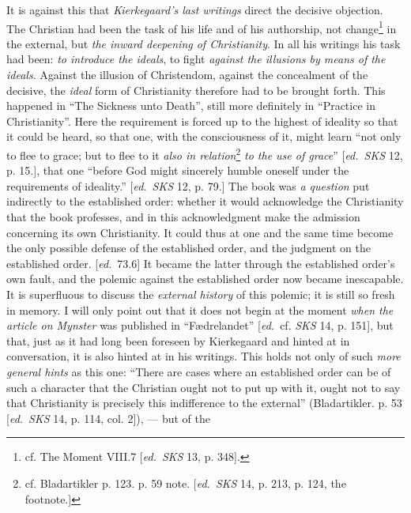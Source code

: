 \documentclass[12pt,a4paper,openany]{book}
\newcommand{\kpage}[1]{\marginnote{\footnotesize\textit{[#1]}}}
\newcommand{\ed}[1]{{\small[\textit{ed.}\ #1]}}
\begin{document}
It is against this that \emph{Kierkegaard's last writings} direct the decisive
objection. The Christian had been the task of his life and of his authorship,
not change\footnote[101]{cf. The Moment VIII.7 \ed{\emph{SKS} 13, p. 348}.}
in the external, but \emph{the inward deepening
of Christianity}. In all his writings his task had been: \emph{to introduce
the ideals}, to fight \emph{against the illusions by means of the ideals}. Against the illusion
of Christendom, against the concealment of the decisive, the
\emph{ideal} form of Christianity therefore had to be brought forth. This happened
in ``The Sickness unto Death'', still more definitely in ``Practice in Christianity''.
Here the requirement is forced up to the highest of ideality
so that it could be heard, so that one, with the consciousness of it,
might learn ``not only to flee to grace; but to flee to it
\emph{also in relation}\footnote[102]{cf. Bladartikler p. 123. p. 59 note. \ed{\emph{SKS} 14, p. 213, p. 124, the footnote.}}
\emph{to the use of grace}'' \ed{\emph{SKS} 12, p. 15.}, that one ``before
God might sincerely humble oneself under the requirements of ideality.''
\ed{\emph{SKS} 12, p. 79.} The book was \emph{a question} put indirectly to
the established order: whether it would acknowledge the Christianity that
the book professes, and in this acknowledgment make the admission concerning its own
Christianity. It could thus at one and the same time become
the only possible defense of the established order, and the judgment on the
established order. \ed{73.6} It became the latter through the established order's own
fault, and the polemic against the established order now became inescapable.
It is superfluous to discuss the \emph{external history} of this polemic; it is still\kpage{159}
so fresh in memory. I will only point out that it
does not begin at the moment \emph{when the article on Mynster} was published in
``Fædrelandet'' \ed{cf. \emph{SKS} 14, p. 151}, but that, just as it had long
been foreseen by Kierkegaard and hinted at in conversation, it is also hinted at
in his writings. This holds not only of such \emph{more general
hints} as this one: ``There are cases where an established order can
be of such a character that the Christian ought not to put up with it,
ought not to say that Christianity is precisely this indifference to the
external'' (Bladartikler. p. 53 \ed{\emph{SKS} 14, p. 114, col. 2}), --- but of the
\end{document}
